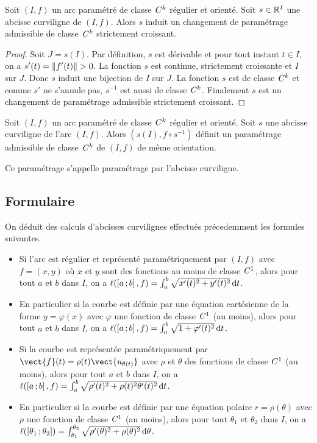 \begin{theo}
  Soit $(I,f)$ un arc paramétré de classe $\mathit{C}^k$ régulier et orienté. Soit $s \in \mathbb{R}^I$ une abcisse curviligne de $(I, f)$. Alors $s$ induit un changement de paramétrage admissible de classe $\mathit{C}^k$ strictement croissant.
\end{theo}
\begin{proof}
  Soit $J=s(I)$. Par définition, $s$ est dérivable et pour tout instant $t \in I$, on a $s'(t)=\left\lVert f'(t)\right\rVert>0$. La fonction $s$ est continue, strictement croissante et $I$ sur $J$. Donc $s$ induit une bijection de $I$ sur $J$. La fonction $s$ est de classe $\mathit{C}^k$ et comme $s'$ ne s'annule pas, $s^{-1}$ est aussi de classe $\mathit{C}^k$. Finalement $s$ est un changement de paramétrage admissible strictement croissant.
\end{proof}

\begin{corth}
  Soit $(I,f)$ un arc paramétré de classe $\mathit{C}^k$ régulier et orienté. Soit $s$ une abcisse curviligne de l'arc $(I,f)$. Alors $(s(I), f\circ s^{-1})$ définit un paramétrage admissible de classe $\mathit{C}^k$ de $(I, f)$ de même orientation. 

Ce paramétrage s'appelle paramétrage par l'abcisse curviligne.
\end{corth}

\subsection{Formulaire}

On déduit des calculs d'abcisses curvilignes effectués précedemment les formules suivantes.
\begin{itemize}
\item Si l'arc est régulier et représenté paramétriquement par $(I, f)$ avec $f=(x,y)$ où $x$ et $y$ sont des fonctions au moins de classe $\mathit{C}^1$, alors pour tout $a$ et $b$ dans $I$, on a $\ell(\left[ a \, ;  b \right],f)=\int_a^b\sqrt{x'(t)^2+y'(t)^2}\mathop{}\mathopen{}\mathrm{d} t$.
\item En particulier si la courbe est définie par une équation cartésienne de la forme $y=\varphi(x)$ avec $\varphi$ une fonction de classe $\mathit{C}^1$ (au moins), alors pour tout $a$ et $b$ dans $I$, on a $\ell(\left[ a \, ;  b \right],f)=\int_a^b\sqrt{1+\varphi'(t)^2}\mathop{}\mathopen{}\mathrm{d} t$.
\item Si la courbe est représentée paramétriquement par $\vect{f}(t)=\rho(t)\vect{u_{\theta(t)}}$ avec $\rho$ et $\theta$ des fonctions de classe $\mathit{C}^1$ (au moins), alors pour tout $a$ et $b$ dans $I$, on a $\ell(\left[ a \, ;  b \right],f)=\int_a^b\sqrt{\rho'(t)^2+\rho(t)^2\theta'(t)^2}\mathop{}\mathopen{}\mathrm{d} t$.
\item En particulier si la courbe est définie par une équation polaire $r=\rho(\theta)$ avec $\rho$ une fonction de classe $\mathit{C}^1$ (au moins), alors pour tout $\theta_1$ et $\theta_2$ dans $I$, on a $\ell(\left[ \theta_1 \, ;  \theta_2 \right])=\int_{\theta_1}^{\theta_2}\sqrt{\rho'(\theta)^2+\rho(\theta)^2}\mathop{}\mathopen{}\mathrm{d} \theta$.
\end{itemize}

